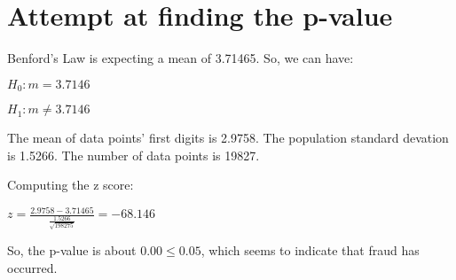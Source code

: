 \documentclass[12pt]{article}
\begin{document}
\section*{Attempt at finding the p-value}

Benford's Law is expecting a mean of 3.71465. So, we can have:

$H_{0}: m = 3.7146$

\vspace{2 mm}

$H_{1}: m \neq 3.7146$

\vspace{2 mm}
\noindent
The mean of data points' first digits is 2.9758.
The population standard devation is 1.5266.
The number of data points is 19827.

\vspace{2 mm}
\noindent
Computing the z score:

\vspace{2 mm}
$z = \frac{2.9758 - 3.71465}{\frac{1.5266}{\sqrt{198275}}} = -68.146$

\vspace{2 mm}
\noindent
So, the p-value is about $0.00 \le 0.05$, which seems to indicate that fraud has occurred.
\end{document}
